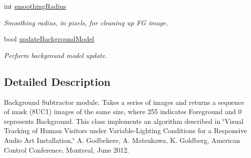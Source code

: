 \begin{DoxyCompactItemize}
int \hyperlink{classcv_1_1BackgroundSubtractorGMG_a243c4a842164e497af83707a5a1a9cf6}{smoothing\-Radius}
\begin{DoxyCompactList}\small\item\em Smoothing radius, in pixels, for cleaning up F\-G image. \end{DoxyCompactList}\item 
bool \hyperlink{classcv_1_1BackgroundSubtractorGMG_a8095e2a8182e87e02afdc4c3d30959d1}{update\-Background\-Model}
\begin{DoxyCompactList}\small\item\em Perform background model update. \end{DoxyCompactList}\end{DoxyCompactItemize}


\subsection{Detailed Description}
Background Subtractor module. Takes a series of images and returns a sequence of mask (8\-U\-C1) images of the same size, where 255 indicates Foreground and 0 represents Background. This class implements an algorithm described in \char`\"{}\-Visual Tracking of Human Visitors under
\-Variable-\/\-Lighting Conditions for a Responsive Audio Art Installation,\char`\"{} A. Godbehere, A. Matsukawa, K. Goldberg, American Control Conference, Montreal, June 2012. 

